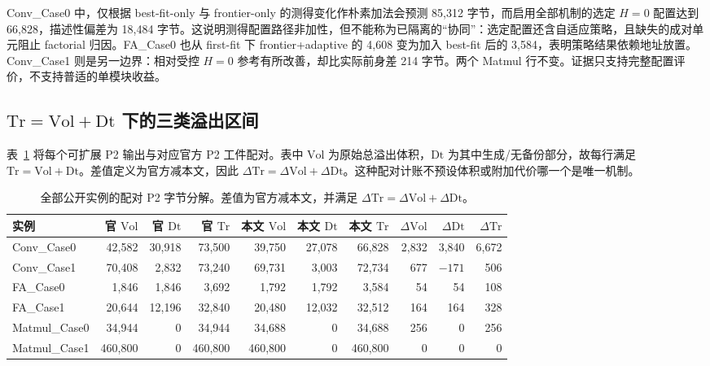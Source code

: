 Conv\_Case0 中，仅根据 best-fit-only 与 frontier-only 的测得变化作朴素加法会预测 85,312 字节，而启用全部机制的选定 $H=0$ 配置达到 66,828，描述性偏差为 18,484 字节。这说明测得配置路径非加性，但不能称为已隔离的“协同”：选定配置还含自适应策略，且缺失的成对单元阻止 factorial 归因。FA\_Case0 也从 first-fit 下 frontier+adaptive 的 4,608 变为加入 best-fit 后的 3,584，表明策略结果依赖地址放置。Conv\_Case1 则是另一边界：相对受控 $H=0$ 参考有所改善，却比实际前身差 214 字节。两个 Matmul 行不变。证据只支持完整配置评价，不支持普适的单模块收益。

\subsection{$\mathrm{Tr}=\mathrm{Vol}+\mathrm{Dt}$ 下的三类溢出区间}\label{sec:supp-cost-regimes-zh}

表~\ref{tab:supp-decomp-zh} 将每个可扩展 P2 输出与对应官方 P2 工件配对。表中 $\mathrm{Vol}$ 为原始总溢出体积，$\mathrm{Dt}$ 为其中生成/无备份部分，故每行满足 $\mathrm{Tr}=\mathrm{Vol}+\mathrm{Dt}$。差值定义为官方减本文，因此 $\Delta\mathrm{Tr}=\Delta\mathrm{Vol}+\Delta\mathrm{Dt}$。这种配对计账不预设体积或附加代价哪一个是唯一机制。

\begin{table}[htbp]\centering\small
\caption{全部公开实例的配对 P2 字节分解。差值为官方减本文，并满足 $\Delta\mathrm{Tr}=\Delta\mathrm{Vol}+\Delta\mathrm{Dt}$。}
\label{tab:supp-decomp-zh}
\setlength{\tabcolsep}{2.2pt}
\begin{tabular}{@{}lrrrrrrrrr@{}}\toprule
实例 & 官 $\mathrm{Vol}$ & 官 $\mathrm{Dt}$ & 官 $\mathrm{Tr}$ & 本文 $\mathrm{Vol}$ & 本文 $\mathrm{Dt}$ & 本文 $\mathrm{Tr}$ & $\Delta\mathrm{Vol}$ & $\Delta\mathrm{Dt}$ & $\Delta\mathrm{Tr}$\\\midrule
Conv\_Case0 & 42,582 & 30,918 & 73,500 & 39,750 & 27,078 & 66,828 & 2,832 & 3,840 & 6,672\\
Conv\_Case1 & 70,408 & 2,832 & 73,240 & 69,731 & 3,003 & 72,734 & 677 & $-171$ & 506\\
FA\_Case0 & 1,846 & 1,846 & 3,692 & 1,792 & 1,792 & 3,584 & 54 & 54 & 108\\
FA\_Case1 & 20,644 & 12,196 & 32,840 & 20,480 & 12,032 & 32,512 & 164 & 164 & 328\\
Matmul\_Case0 & 34,944 & 0 & 34,944 & 34,688 & 0 & 34,688 & 256 & 0 & 256\\
Matmul\_Case1 & 460,800 & 0 & 460,800 & 460,800 & 0 & 460,800 & 0 & 0 & 0\\\bottomrule
\end{tabular}
\end{table}

